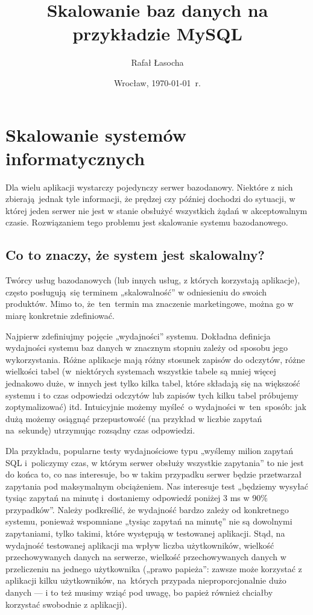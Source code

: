 \documentclass[a4paper,12pt]{article}
\title{{\textbf{Skalowanie baz danych na przykładzie MySQL}}}
\author{Rafał Łasocha}
\date{Wrocław, \today\ r.}
\begin{document}
\maketitle

\section{Skalowanie systemów informatycznych}

Dla wielu aplikacji wystarczy pojedynczy serwer bazodanowy. Niektóre z nich zbierają jednak tyle informacji, że prędzej czy później dochodzi do sytuacji, w której jeden serwer nie jest w stanie obsłużyć wszystkich żądań w akceptowalnym czasie. Rozwiązaniem tego problemu jest skalowanie systemu bazodanowego.

\subsection{Co to znaczy, że system jest skalowalny?}

Twórcy usług bazodanowych (lub innych usług, z których korzystają aplikacje), często posługują się terminem „skalowalność” w odniesieniu do swoich produktów. Mimo to, że~ten~termin ma znaczenie marketingowe, można go w miarę konkretnie zdefiniować. 

Najpierw zdefiniujmy pojęcie „wydajności” systemu. Dokładna definicja wydajności systemu baz danych w znacznym stopniu zależy od sposobu jego wykorzystania. Różne aplikacje mają różny stosunek zapisów do odczytów, różne wielkości tabel (w~niektórych systemach wszystkie tabele są mniej więcej jednakowo duże, w innych jest tylko kilka tabel, które składają się na większość systemu i to czas odpowiedzi odczytów lub zapisów tych kilku tabel próbujemy zoptymalizować) itd. Intuicyjnie możemy myśleć~o wydajności w~ten~sposób: jak dużą możemy osiągnąć przepustowość (na przykład w liczbie zapytań na~sekundę) utrzymując rozsądny czas odpowiedzi.

Dla przykładu, popularne testy wydajnościowe typu „wyślemy milion zapytań SQL i~policzymy czas, w którym serwer obsłuży wszystkie zapytania” to nie jest do końca to, co nas interesuje, bo w takim przypadku serwer będzie przetwarzał zapytania pod maksymalnym obciążeniem. Nas interesuje test „będziemy wysyłać tysiąc zapytań na minutę i~dostaniemy odpowiedź poniżej 3 ms w 90\% przypadków”. Należy podkreślić, że wydajność bardzo zależy od konkretnego systemu, ponieważ wspomniane „tysiąc zapytań na minutę” nie są dowolnymi zapytaniami, tylko takimi, które występują w testowanej aplikacji. Stąd, na wydajność testowanej aplikacji ma wpływ liczba użytkowników, wielkość przechowywanych danych na serwerze, wielkość przechowywanych danych w przeliczeniu na jednego użytkownika („prawo papieża”: zawsze może korzystać z aplikacji kilku użytkowników, na~których przypada nieproporcjonalnie dużo danych --- i to też musimy wziąć pod uwagę, bo papież również chciałby korzystać swobodnie z aplikacji).
\end{document}
